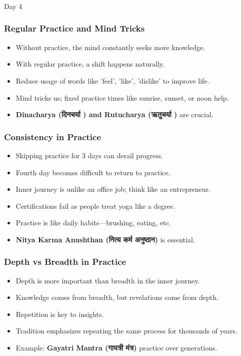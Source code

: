 \begin{frame}[fragile]\frametitle{}
\begin{center}
{\Large Day 4}
\end{center}
\end{frame}

\begin{frame}[fragile]\frametitle{Regular Practice and Mind Tricks}
      \begin{itemize}
        \item Without practice, the mind constantly seeks more knowledge.
        \item With regular practice, a shift happens naturally.
        \item Reduce usage of words like 'feel', 'like', 'dislike' to improve life.
        \item Mind tricks us; fixed practice times like sunrise, sunset, or noon help.
        \item \textbf{Dinacharya (दिनचर्या ) and Rutucharya (ऋतुचर्या )} are crucial.
      \end{itemize}
\end{frame}

\begin{frame}[fragile]\frametitle{Consistency in Practice}
      \begin{itemize}
        \item Skipping practice for 3 days can derail progress.
        \item Fourth day becomes difficult to return to practice.
        \item Inner journey is unlike an office job; think like an entrepreneur.
        \item Certifications fail as people treat yoga like a degree.
        \item Practice is like daily habits—brushing, eating, etc.
        \item \textbf{Nitya Karma Anushthan (नित्य कर्म अनुष्ठान)} is essential.
      \end{itemize}
\end{frame}

\begin{frame}[fragile]\frametitle{Depth vs Breadth in Practice}
      \begin{itemize}
        \item Depth is more important than breadth in the inner journey.
        \item Knowledge comes from breadth, but revelations come from depth.
        \item Repetition is key to insights.
        \item Tradition emphasizes repeating the same process for thousands of years.
        \item Example: \textbf{Gayatri Mantra (गायत्री मंत्र)} practice over generations.
      \end{itemize}
\end{frame}

